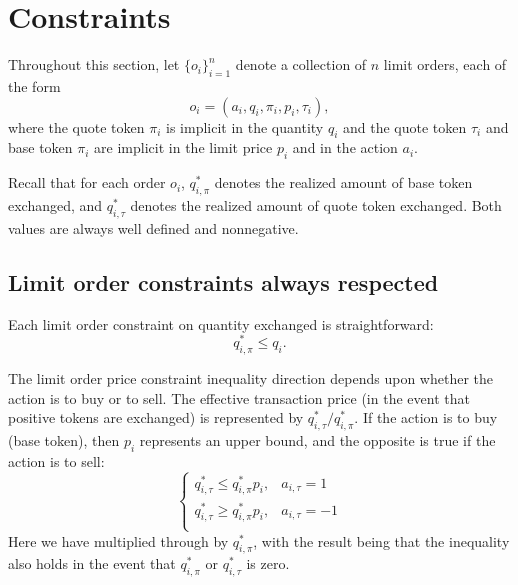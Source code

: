 \documentclass[11pt, reqno]{amsart}
\theoremstyle{definition}
\theoremstyle{remark}
\begin{document}
\section{Constraints}

Throughout this section, let $\{o_i\}_{i=1}^n$ denote a collection of $n$ limit
orders, each of the form
\[
    o_i = (a_i, q_i, \pi_i, p_i, \tau_i),
\]
where the quote token $\pi_i$ is implicit in the quantity $q_i$ and
the quote token $\tau_i$ and base token $\pi_i$ are implicit in the limit price
$p_i$ and in the action $a_i$.

Recall that for each order $o_i$, $q_{i, \pi}^*$ denotes the realized amount of
base token exchanged, and $q_{i, \tau}^*$ denotes the realized amount of quote
token exchanged. Both values are always well defined and nonnegative.

\subsection{Limit order constraints always respected}

Each limit order constraint on quantity exchanged is straightforward:
\begin{equation}\label{limit_order_quantity_constraint}
    q_{i, \pi}^* \leq q_i.
\end{equation}

The limit order price constraint inequality direction depends upon whether the
action is to buy or to sell.
The effective transaction price (in the event that positive tokens are
exchanged) is represented by $q_{i, \tau}^* / q_{i, \pi}^*$. If the action is to
buy (base token), then $p_i$ represents an upper bound, and the opposite is true
if the action is to sell:
\begin{equation}\label{limit_order_price_constraint}
    \begin{cases}
        q_{i, \tau}^* \leq q_{i, \pi}^* p_i, & a_{i, \tau} = 1 \\
        q_{i, \tau}^* \geq q_{i, \pi}^* p_i, & a_{i, \tau} = -1 \\
    \end{cases}
\end{equation}
Here we have multiplied through by $q_{i, \pi}^*$, with the result being that
the inequality also holds in the event that $q_{i, \pi}^*$ or $q_{i, \tau}^*$ is
zero.


\end{document}
